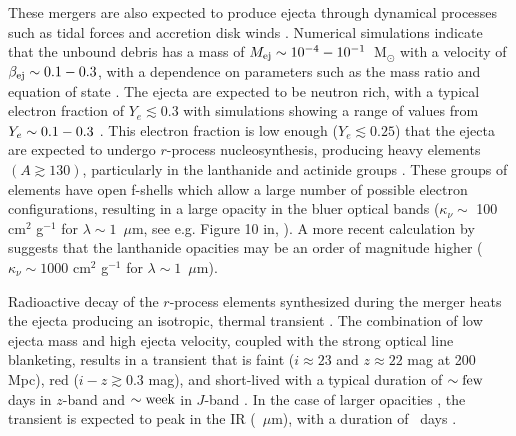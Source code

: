 These mergers are also expected to produce ejecta through dynamical processes such as tidal forces and accretion disk winds \citep{Goriely+11,Bauswein+13a,Fernandez+15,Radice+16,Metzger2017,SiegelMetzger17}. Numerical simulations indicate that the unbound debris has a mass of $M_{\rm ej} \sim 10^{-4} - 10^{-1}$~M$_{\odot}$ with a velocity of $\beta_{\rm ej} \sim 0.1 - 0.3$, with a dependence on parameters such as the mass ratio and equation of state \citep{Hotokezaka+13,Tanaka+14,Kyutoku+15}. The ejecta are expected to be neutron rich, with a typical electron fraction of $Y_e \lesssim 0.3$ with simulations showing a range of values from $Y_e \sim 0.1 - 0.3$ \citep{Goriely+11,Bauswein+13a,Sekiguchi+15, Radice+16,SiegelMetzger17}. This electron fraction is low enough ($Y_e \lesssim 0.25$) that the ejecta are expected to undergo $r$-process nucleosynthesis, producing heavy elements $(A \gtrsim 130)$, particularly in the lanthanide and actinide groups \citep{Goriely+11,Bauswein+13a,SiegelMetzger17}. These groups of elements have open f-shells which allow a large number of possible electron configurations, resulting in a large opacity in the bluer optical bands ($\kappa_{\nu} \sim$ 100 cm$^2$ g$^{-1}$ for $\lambda \sim 1$~$\mu$m, see e.g. Figure 10 in, \citealt{Kasen+13}). A more recent calculation by \cite{Fontes+17} suggests that the lanthanide opacities may be an order of magnitude higher ($\kappa_{\nu} \sim 1000$  cm$^2$ g$^{-1}$ for $\lambda \sim 1$~$\mu$m).

Radioactive decay of the $r$-process elements synthesized during the merger heats the ejecta producing an isotropic, thermal transient \citep{LP98,Rosswog2005, Metzger+10,Tanaka+14,Metzger2017}. The combination of low ejecta mass and high ejecta velocity, coupled with the strong optical line blanketing, results in a transient that is faint ($i \approx 23$ and $z \approx 22$ mag at 200 Mpc), red ($i-z \gtrsim 0.3$ mag), and short-lived with a typical duration of $\sim {\rm few}$ days in $z$-band and $\sim{\rm week}$ in $J$-band \citep{BarnesKasen13,Barnes+16,Metzger2017}. In the case of larger opacities \citep[e.g.,][]{Fontes+17}, the transient is expected to peak in the IR (~$\mu$m), with a duration of ~days \citep{Fontes+17,Wollaeger+17}.

